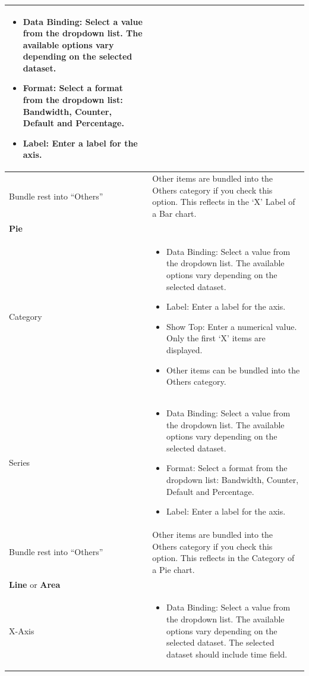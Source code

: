 \begin{description}
\begin{longtable}{p{}|p{}}
\begin{itemize}
                    \item Data Binding: Select a value from the dropdown list. The available options vary depending on the selected dataset.
                    \item Format: Select a format from the dropdown list: Bandwidth, Counter, Default and Percentage.
                    \item Label: Enter a label for the axis.            
                 \end{itemize} \\\hline 
        Bundle rest into “Others” & Other items are bundled into the Others category if you check this option. This reflects in the ‘X’ Label of a Bar chart. \\\hline 
        \multicolumn{2}{l}{\textbf{Pie}}\\\hline
        Category & \begin{itemize}
                        \item Data Binding: Select a value from the dropdown list. The available options vary depending on the selected dataset.
                        \item Label: Enter a label for the axis.
                        \item Show Top: Enter a numerical value. Only the first ‘X’ items are displayed.
                        \item Other items can be bundled into the Others category.
                   \end{itemize} \\\hline 
        Series & \begin{itemize}
                    \item Data Binding: Select a value from the dropdown list. The available options vary depending on the selected dataset.
                    \item Format: Select a format from the dropdown list: Bandwidth, Counter, Default and Percentage.
                    \item Label: Enter a label for the axis.
                 \end{itemize} \\\hline
        Bundle rest into “Others” & Other items are bundled into the Others category if you check this option. This reflects in the Category of a Pie chart.\\\hline
        \multicolumn{2}{l}{\textbf{Line} or \textbf{Area}}\\\hline
        X-Axis & \begin{itemize}
                    \item Data Binding: Select a value from the dropdown list. The available options vary depending on the selected dataset. The selected dataset should include time field.
                    


\end{itemize}
\end{longtable}
\end{description}
